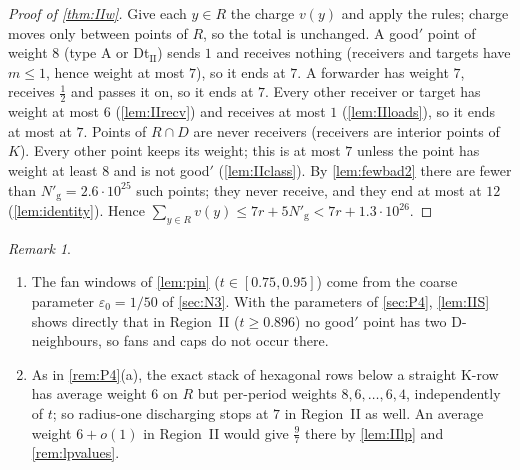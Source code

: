 \documentclass[11pt]{amsart}
\theoremstyle{definition}
\theoremstyle{remark}
\newtheorem{remark}[theorem]{Remark}
\newcommand{\eps}{\varepsilon}
\begin{document}
\begin{proof}[Proof of \cref{thm:IIw}]
Give each $y\in R$ the charge $v(y)$ and apply the rules; charge moves only between points of $R$, so the total is unchanged. A good$'$ point of weight $8$ (type A or Dt$_{\mathrm{II}}$) sends $1$ and receives nothing (receivers and targets have $m\le1$, hence weight at most $7$), so it ends at $7$. A forwarder has weight $7$, receives $\frac12$ and passes it on, so it ends at $7$. Every other receiver or target has weight at most $6$ (\cref{lem:IIrecv}) and receives at most $1$ (\cref{lem:IIloads}), so it ends at most at $7$. Points of $R\cap D$ are never receivers (receivers are interior points of $K$). Every other point keeps its weight; this is at most $7$ unless the point has weight at least $8$ and is not good$'$ (\cref{lem:IIclass}). By \cref{lem:fewbad2} there are fewer than $N'_{\mathrm g}=2.6\cdot10^{25}$ such points; they never receive, and they end at most at $12$ (\cref{lem:identity}). Hence $\sum_{y\in R}v(y)\le7r+5N'_{\mathrm g}<7r+1.3\cdot10^{26}$.
\end{proof}

\begin{remark}\label{rem:IIw}
\begin{enumerate}[leftmargin=2em,label=(\alph*)]
\item The fan windows of \cref{lem:pin} ($t\in[0.75,0.95]$) come from the coarse parameter $\eps_0=1/50$ of \cref{sec:N3}. With the parameters of \cref{sec:P4}, \cref{lem:IIS} shows directly that in Region~II ($t\ge0.896$) no good$'$ point has two D-neighbours, so fans and caps do not occur there.
\item As in \cref{rem:P4}(a), the exact stack of hexagonal rows below a straight K-row has average weight $6$ on $R$ but per-period weights $8,6,\dots,6,4$, independently of $t$; so radius-one discharging stops at $7$ in Region~II as well. An average weight $6+o(1)$ in Region~II would give $\frac97$ there by \cref{lem:IIlp} and \cref{rem:lpvalues}.
\end{enumerate}
\end{remark}
\end{document}
